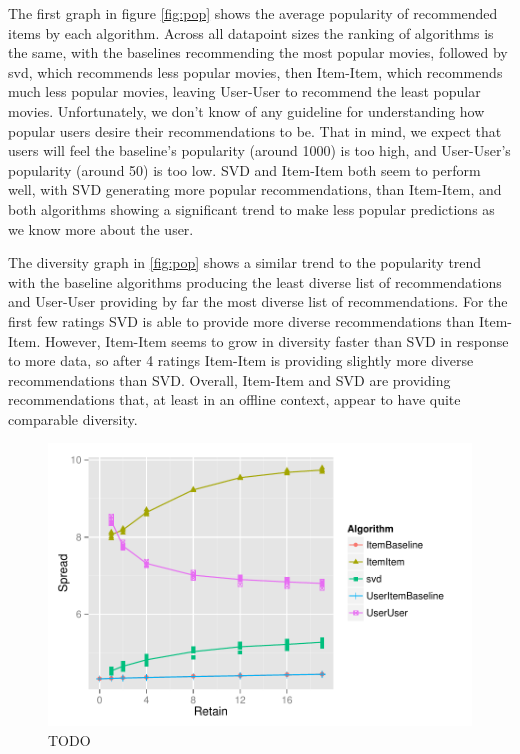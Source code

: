 \documentclass[letterpaper]{sig-alternate}
\begin{document}
  The first graph in figure \ref{fig:pop} shows the average popularity of recommended items by each algorithm.
  Across all datapoint sizes the ranking of algorithms is the same, with the baselines recommending the most popular movies, followed by svd, which recommends less popular movies, then Item-Item, which recommends much less popular movies, leaving User-User to recommend the least popular movies.
  Unfortunately, we don't know of any guideline for understanding how popular users desire their recommendations to be.
  That in mind, we expect that users will feel the baseline's popularity (around 1000) is too high, and User-User's popularity (around 50) is too low.
  SVD and Item-Item both seem to perform well, with SVD generating more popular recommendations, than Item-Item, and both algorithms showing a significant trend to make less popular predictions as we know more about the user.

  The diversity graph in \ref{fig:pop} shows a similar trend to the popularity trend with the baseline algorithms producing the least diverse list of recommendations and User-User providing by far the most diverse list of recommendations.
  For the first few ratings SVD is able to provide more diverse recommendations than Item-Item.
  However, Item-Item seems to grow in diversity faster than SVD in response to more data, so after 4 ratings Item-Item is providing slightly more diverse recommendations than SVD.
  Overall, Item-Item and SVD are providing recommendations that, at least in an offline context, appear to have quite comparable diversity.


\begin{figure}[ht!]
  \centering
  \includegraphics[width=1.1\columnwidth]{../lenskit/output/ekstrandTuned20/topN_entropy.pdf}
  \caption{TODO}
  \label{fig:spread}
\end{figure}
\end{document}
